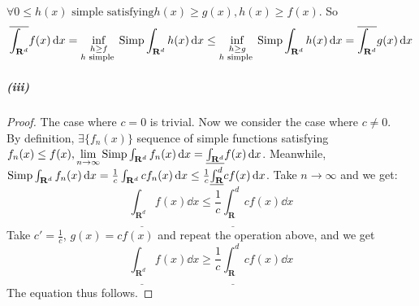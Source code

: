 \documentclass{article}
\begin{document}
$\forall 0\leq h(x)\text{ simple satisfying}h(x)\geq g(x), h(x)\geq f(x)$. So
\[\overline{\int_{\mathbf{R}^d}}f(x)\,\mathrm{d} x=\inf_{\substack{h\geq f\\h\text{ simple }}}\mathrm{Simp}\int_{\mathbf{R}^d}h(x)\,\mathrm{d} x\leq \inf_{\substack{h\geq g\\h\text{ simple }}}\mathrm{Simp}\int_{\mathbf{R}^d}h(x)\,\mathrm{d} x=\overline{\int_{\mathbf{R}^d}}g(x)\,\mathrm{d} x\] 
\subparagraph{(iii)}
\begin{proof}
The case where $c=0$ is trivial. Now we consider the case where $c\neq 0$.\\
By definition, $\exists \{f_n(x)\}$ sequence of simple functions satisfying $f_n(x)\leq f(x), \lim\limits_{n\to\infty}\mathrm{Simp}\int_{\mathbf{R}^d}f_n(x)\,\mathrm{d} x=\underline{\int_{\mathbf{R}^d}}f(x)\,\mathrm{d} x$. Meanwhile, $\mathrm{Simp}\int_{\mathbf{R}^d}f_n(x)\,\mathrm{d} x=\frac{1}{c}\int_{\mathbf{R}^d}cf_n(x)\,\mathrm{d} x\leq \frac{1}{c}\underline{\int_\mathbf{R}^d}cf(x)\,\mathrm{d} x$. Take $n\to\infty$ and we get:
\[\underline{\int_{\mathbf{R}^d}}f(x)\dd x\leq\frac{1}{c}\underline{\int_\mathbf{R}^d}cf(x)\dd x\]
Take $c'=\frac{1}{c}$, $g(x)=cf(x)$ and repeat the operation above, and we get
\[\underline{\int_{\mathbf{R}^d}}f(x)\dd x\geq\frac{1}{c}\underline{\int_\mathbf{R}^d}cf(x)\dd x\]
The equation thus follows.
\end{proof}
\end{document}
